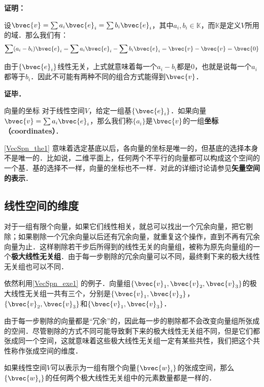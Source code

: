 \textbf{证明：}

设$\bvec{v}=\sum a_i\bvec{e}_i=\sum b_i\bvec{e}_i$，其中$a_i, b_i\in \mathbb{K}$，而$\mathbb{K}$是定义$V$所用的域．那么我们有：
\begin{equation}
\sum(a_i-b_i)\bvec{e}_i=\sum a_i\bvec{e}_i-\sum b_i\bvec{e}_i=\bvec{v}-\bvec{v}=\bvec{0}
\end{equation}

由于$\{\bvec{e}_i\}$线性无关，上式就意味着每一个$a_i-b_i$都是$0$，也就是说每一个$a_i$都等于$b_i$．因此不可能有两种不同的组合方式能得到$\bvec{v}$．

\textbf{证毕．}

\begin{definition}{向量的坐标}
对于线性空间$V$，给定一组基$\{\bvec{e}_i\}$．如果向量$\bvec{v}=\sum a_i\bvec{e}_i$，那么我们称$\{a_i\}$是$\bvec{v}$的一组\textbf{坐标（coordinates）}．
\end{definition}

\autoref{VecSpn_the1} 意味着选定基底以后，各向量的坐标是唯一的，但基底的选择本身不是唯一的．比如说，二维平面上，任何两个不平行的向量都可以构成这个空间的一个基．基的选择不一样，向量的坐标也不一样．对此的详细讨论请参见\textbf{矢量空间的表示}．

\subsection{线性空间的维度}

对于一组有限个向量，如果它们线性相关，就总可以找出一个冗余向量，把它剔除；如果剔除一个冗余向量以后还有冗余向量，就重复这个操作，直到不再有冗余向量为止．这样剔除若干步后所得到的线性无关的向量组，被称为原先向量组的一个\textbf{极大线性无关组}．由于每一步剔除的冗余向量可以不同，最终剩下来的极大线性无关组也可以不同．

\begin{example}{}
依然利用\autoref{VecSpn_exe1} 的例子．向量组$\{\bvec{v}_1, \bvec{v}_2, \bvec{v}_3\}$的极大线性无关组一共有三个，分别是$\{\bvec{v}_1, \bvec{v}_2\}$，$\{\bvec{v}_2, \bvec{v}_3\}$和$\{\bvec{v}_1, \bvec{v}_3\}$．
\end{example}

由于每一步剔除的向量都是“冗余”的，因此每一步的剔除都不会改变向量组所张成的空间．尽管剔除的方式不同可能导致剩下来的极大线性无关组不同，但是它们都张成同一个空间，这就意味着这些极大线性无关组一定有某些共性，我们把这个共性称作张成空间的维度．

\begin{theorem}{}\label{VecSpn_the2}
如果线性空间$V$可以表示为一组有限个向量$\{\bvec{w}_i\}$的张成空间，那么$\{\bvec{w}_i\}$的任何两个极大线性无关组中的元素数量都是一样的．
\end{theorem}


